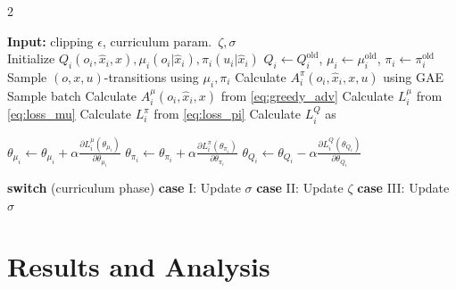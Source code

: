 \documentclass[12pt, final]{l4dc2023}
\begin{document}
\begin{algorithm}
\caption{Learning algorithm for distributed event-triggered control.
}\label{alg:multi-agent}
\begin{multicols}{2}
\begin{algorithmic}[1]
\STATE \textbf{Input:} clipping $\epsilon$, curriculum param.\ $\zeta, \sigma$ \\
    \STATE Initialize $Q_{i}(o_i ,\hat{x}_i ,x), \mu_i(o_{i}\vert\hat{x}_i), \pi_i(u_{i}\vert\hat{x}_i)$
\ENDFOR
{}
        \STATE $Q_{i} \gets Q_{i}^\mathrm{old}$, $\mu_i \gets \mu_i^\mathrm{old}$, $\pi_i \gets \pi_i^\mathrm{old}$
    \ENDFOR
    \STATE Sample $(o,x,u)$-transitions using $\mu_i, \pi_i$
        \STATE Calculate $A^{\pi}_{i}(o_i, \hat{x}_i, x, u)$ using GAE
                \STATE Sample batch
                \STATE Calculate $A^{\mu}_{i}(o_i,\hat{x}_i,x)$ from \eqref{eq:greedy_adv}
                \STATE Calculate $L^{\mu}_{i}$ from \eqref{eq:loss_mu}
                \STATE Calculate $L^{\pi}_{i}$ from \eqref{eq:loss_pi}
                \STATE Calculate $L^{Q}_{i}$ as \cite{funk2021learning} 
                
                \STATE $\theta_{\mu_{i}}\gets \theta_{\mu_{i}}+\alpha\frac{\partial L^{\mu}_{i}(\theta_{\mu_{i}})}{\partial\theta_{\mu_{i}}}$
                \STATE $\theta_{\pi_{i}}\gets \theta_{\pi_{i}}+\alpha\frac{\partial L^{\pi}_{i}(\theta_{\pi_{i}})}{\partial\theta_{\pi_{i}}}$
                \STATE $\theta_{Q_{i}} \gets \theta_{Q_{i}}-\alpha\frac{\partial L^{Q}_{i}(\theta_{Q_{i}})}{\partial\theta_{Q_{i}}}$
\ENDFOR
\ENDFOR
\ENDFOR

\STATE \textbf{switch} (curriculum phase)
\STATE \hspace{10pt} \textbf{case} I: Update $\sigma$
\STATE \hspace{10pt} \textbf{case} II: Update $\zeta$
\STATE \hspace{10pt} \textbf{case} III: Update $\sigma$

\ENDFOR
\end{algorithmic}
\end{multicols}
\end{algorithm}


\section{Results and Analysis}
\end{document}
